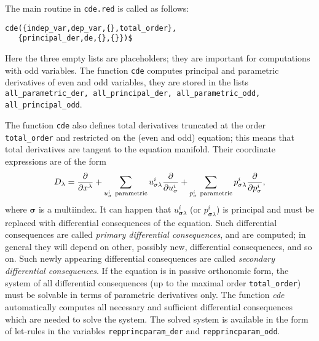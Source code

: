 The main routine in \texttt{cde.red} is called as follows:
\begin{verbatim}
cde({indep_var,dep_var,{},total_order},
   {principal_der,de,{},{}})$
\end{verbatim}
Here the three empty lists are placeholders; they are important for
computations with odd variables. The function \texttt{cde}
computes principal and parametric derivatives of even and odd variables, they
are stored in the lists \texttt{all\_parametric\_der, all\_principal\_der, 
all\_parametric\_odd, all\_principal\_odd}.

The function \texttt{cde} also defines total derivatives truncated at the order
\texttt{total\_order} and restricted on the (even and odd) equation; this means
that total derivatives are tangent to the equation manifold. Their coordinate
expressions are of the form
\begin{equation}
  D_\lambda=\pd{}{x^\lambda}+\sum_{u^i_{\mathbf{\sigma}}\
    \text{parametric}}u^i_{\mathbf{\sigma}\lambda}\pd{}{u^i_{\mathbf{\sigma}}}
  + \sum_{p^i_{\mathbf{\sigma}}\
    \text{parametric}}p^i_{\mathbf{\sigma}\lambda}\pd{}{p^i_{\mathbf{\sigma}}},
\end{equation}
where $\mathbf{\sigma}$ is a multiindex.  It can happen that
$u^i_{\mathbf{\sigma}\lambda}$ (or $p^i_{\mathbf{\sigma}\lambda}$) is
principal and must be replaced with differential consequences of the equation.
Such differential consequences are called \emph{primary differential
  consequences}, and are computed; in general they will depend on other,
possibly new, differential consequences, and so on. Such newly appearing
differential consequences are called \emph{secondary differential
  consequences}. If the equation is in passive orthonomic form, the system of
all differential consequences (up to the maximal order \texttt{total\_order})
must be solvable in terms of parametric derivatives only. The function
\emph{cde} automatically computes all necessary and sufficient differential
consequences which are needed to solve the system. The solved system is
available in the form of \REDUCE let-rules in the variables
\texttt{repprincparam\_der} and \texttt{repprincparam\_odd}.


